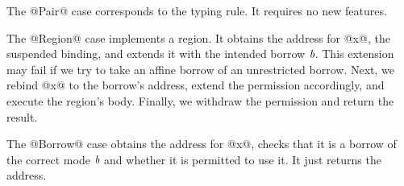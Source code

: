 The @Pair@ case corresponds to the  typing rule. It
requires no new features.


The @Region@ case implements a region. It obtains the address for @x@,
the suspended binding, and extends it with the intended borrow
$\textit{b}$. This extension may fail if we try to take an affine borrow
of an unrestricted borrow. Next, we rebind @x@ to the borrow's
address, extend the permission accordingly, and execute the region's
body.  Finally, we withdraw the permission and return the result.

The @Borrow@ case obtains the address for @x@, checks that it is a
borrow of the correct mode $\textit{b}$ and whether it is permitted to
use it. It just returns the address.

\lstDeleteShortInline@

